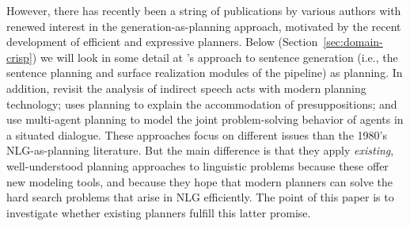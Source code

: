 However, there has recently been a string of publications by various
authors with renewed interest in the generation-as-planning approach,
motivated by the recent development of efficient and expressive
planners. Below (Section~\ref{sec:domain-crisp}) we will look in some
detail at \cite{KolSto07}'s approach to sentence generation (i.e., the
sentence planning and surface realization modules of the pipeline) as
planning. In addition, \citet{Steedman-Petrick:07} revisit the
analysis of indirect speech acts with modern planning technology;
\citet{benotti08b} uses planning to explain the accommodation of
presuppositions; and
\citet{brenner08:_contin_multiag_plann_approac_to_situat_dialog} use
multi-agent planning to model the joint problem-solving behavior of
agents in a situated dialogue. These approaches focus on different
issues than the 1980's NLG-as-planning literature. But the main
difference is that they apply \emph{existing}, well-understood
planning approaches to linguistic problems because these offer new
modeling tools, and because they hope that modern planners can solve
the hard search problems that arise in NLG \citep{KolStr02}
efficiently. The point of this paper is to investigate whether
existing planners fulfill this latter promise.


